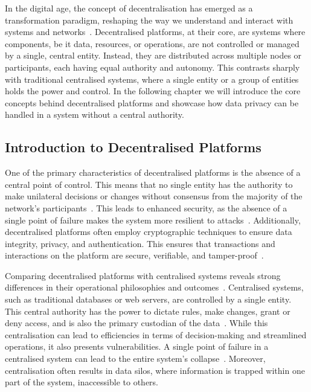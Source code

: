 In the digital age, the concept of decentralisation has emerged as a transformation paradigm, reshaping the way we understand and interact with systems and networks~\cite{Tverdokhlib.2022}. Decentralised platforms, at their core, are systems where components, be it data, resources, or operations, are not controlled or managed by a single, central entity. Instead, they are distributed across multiple nodes or participants, each having equal authority and autonomy. This contrasts sharply with traditional centralised systems, where a single entity or a group of entities holds the power and control. In the following chapter we will introduce the core concepts behind decentralised platforms and showcase how data privacy can be handled in a system without a central authority.


\subsection{Introduction to Decentralised Platforms}

One of the primary characteristics of decentralised platforms is the absence of a central point of control. This means that no single entity has the authority to make unilateral decisions or changes without consensus from the majority of the network's participants~\cite{SEFRAOUI.2022}. This leads to enhanced security, as the absence of a single point of failure makes the system more resilient to attacks~\cite{Maffiola.2022}. Additionally, decentralised platforms often employ cryptographic techniques to ensure data integrity, privacy, and authentication. This ensures that transactions and interactions on the platform are secure, verifiable, and tamper-proof~\cite{SEFRAOUI.2022}.

Comparing decentralised platforms with centralised systems reveals strong differences in their operational philosophies and outcomes~\cite{Maffiola.2022}. Centralised systems, such as traditional databases or web servers, are controlled by a single entity. This central authority has the power to dictate rules, make changes, grant or deny access, and is also the primary custodian of the data~\cite{Maffiola.2022}. While this centralisation can lead to efficiencies in terms of decision-making and streamlined operations, it also presents vulnerabilities. A single point of failure in a centralised system can lead to the entire system's collapse~\cite{Maffiola.2022}. Moreover, centralisation often results in data silos, where information is trapped within one part of the system, inaccessible to others.


